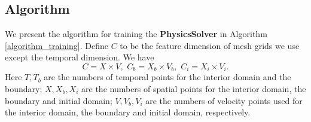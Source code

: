 \documentclass[preprint,11pt]{elsarticle}
\begin{document}
\subsection {Algorithm}
We present the algorithm for training the \textbf{PhysicsSolver} in Algorithm \ref{algorithm_training}. Define $C$ to be the feature dimension of mesh grids we use except the temporal dimension. We have \begin{equation}
    C=X\times V,\, \,C_b= X_b\times V_b, \,\,C_i=X_i\times V_i.
\end{equation} Here $T, T_{b}$ are the numbers of temporal points for the interior domain and the boundary; $X, X_{b}, X_{i}$ are the numbers of spatial points for the interior domain, the boundary and initial domain; $V, V_{b}, V_i$ are the numbers of velocity points used for the interior domain, the boundary and initial domain, respectively. 
\end{document}
